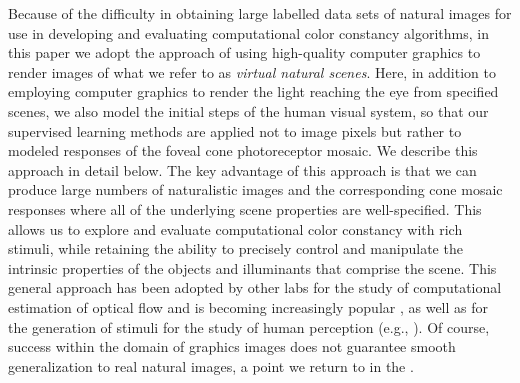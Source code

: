 \documentclass{jov}
\begin{document}
Because of the difficulty in obtaining large labelled data sets of natural images for use in developing and evaluating computational color constancy algorithms, in this paper we adopt the approach of using high-quality computer graphics to render images of what we refer to as {\em virtual natural scenes}. Here, in addition to employing computer graphics to render the light reaching the eye from specified scenes, we also model the initial steps of the human visual system, so that our supervised learning methods are applied not to image pixels but rather to modeled responses of the foveal cone photoreceptor mosaic. We describe this approach in detail below. The key advantage of this approach is that we can produce large numbers of naturalistic images and the corresponding cone mosaic responses where all of the underlying scene properties are well-specified. This allows us to explore and evaluate computational color constancy with rich stimuli, while retaining the ability to precisely control and manipulate the intrinsic properties of the objects and illuminants that comprise the scene. This general approach has been adopted by other labs for the study of computational estimation of optical flow \cite{baker2011database} and is becoming increasingly popular \cite{kovacs17shading},
as well as for the generation of stimuli for the study of human perception (e.g., ). 
Of course, success within the domain of graphics images does not guarantee smooth generalization to real natural images, a point we return to in the .
\end{document}

